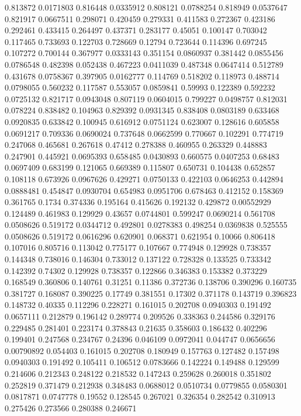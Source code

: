 0.813872 0.0171803
0.816448 0.0335912
0.808121 0.0788254
0.818949 0.0537647
0.821917 0.0667511
0.298071 0.420459
0.279331 0.411583
0.272367 0.423186
0.292461 0.433415
0.264497 0.437371
0.283177 0.45051
0.100147 0.703042
0.117465 0.733693
0.122703 0.728669
0.12794 0.723644
0.114396 0.697245
0.107272 0.700144
0.367977 0.0333143
0.351154 0.0860937
0.381442 0.0855456
0.0786548 0.482398
0.052438 0.467223
0.0411039 0.487348
0.0647414 0.512789
0.431678 0.0758367
0.397905 0.0162777
0.114769 0.518202
0.118973 0.488714
0.0798055 0.560232
0.117587 0.553057
0.0859841 0.59993
0.122389 0.592232
0.0725132 0.821717
0.0943048 0.807119
0.0604015 0.799227
0.0498757 0.812031
0.078224 0.838482
0.104963 0.829392
0.0931345 0.838408
0.0803189 0.633468
0.0920835 0.633842
0.100945 0.616912
0.0751124 0.623007
0.128616 0.605858
0.0691217 0.709336
0.0690024 0.737648
0.0662599 0.770667
0.102291 0.774719
0.247068 0.465681
0.267618 0.47412
0.278388 0.460955
0.263329 0.448883
0.247901 0.445921
0.0695393 0.658485
0.0430893 0.660575
0.0407253 0.68483
0.0697409 0.683199
0.121065 0.669389
0.115807 0.650731
0.104438 0.652857
0.108118 0.673926
0.0967626 0.429271
0.0750133 0.422103
0.0646253 0.442894
0.0888481 0.454847
0.0930704 0.654983
0.0951706 0.678463
0.412152 0.158369
0.361765 0.1734
0.374336 0.195164
0.415626 0.192132
0.429872 0.00552929
0.124489 0.461983
0.129929 0.43657
0.0744801 0.599247
0.0690214 0.561708
0.0508626 0.519172
0.0344712 0.492801
0.0278383 0.498254
0.0369838 0.525555
0.0508626 0.519172
0.0616296 0.620901
0.068371 0.621954
0.10066 0.806418
0.107016 0.805716
0.113042 0.775177
0.107667 0.774948
0.129928 0.738357
0.144348 0.738016
0.146304 0.733012
0.137122 0.728328
0.133525 0.733342
0.142392 0.74302
0.129928 0.738357
0.122866 0.346383
0.153382 0.373229
0.168549 0.360806
0.140761 0.31251
0.11386 0.372736
0.138706 0.390296
0.160735 0.381727
0.168087 0.390225
0.17749 0.381551
0.17302 0.371178
0.143719 0.396823
0.148732 0.40335
0.112296 0.228271
0.161015 0.202708
0.0940303 0.191492
0.0657111 0.212879
0.196142 0.289774
0.209526 0.338363
0.244586 0.329176
0.229485 0.281401
0.223174 0.378843
0.21635 0.358603
0.186432 0.402296
0.199401 0.247568
0.234767 0.24396
0.046109 0.0972041
0.044747 0.0656656
0.00790892 0.054403
0.161015 0.202708
0.180949 0.157763
0.127482 0.157498
0.0940303 0.191492
0.105411 0.106512
0.0783666 0.142224
0.149488 0.129599
0.214606 0.212343
0.248122 0.218532
0.147243 0.259628
0.260018 0.351802
0.252819 0.371479
0.212938 0.348483
0.0688012 0.0510734
0.0779855 0.0580301
0.0817871 0.0747778
0.19552 0.128545
0.267021 0.326354
0.282542 0.310913
0.275426 0.273566
0.280388 0.246671

